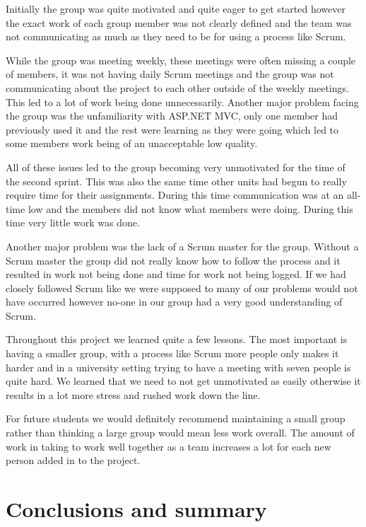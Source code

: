 \documentclass[a4paper,titlepage,12pt]{article}
\let\stdsection\section
\renewcommand\section{\newpage\stdsection}
\begin{document}
Initially the group was quite motivated and quite eager to get started however
the exact work of each group member was not clearly defined and the team was
not communicating as much as they need to be for using a process like Scrum.

While the group was meeting weekly, these meetings were often missing a couple
of members, it was not having daily Scrum meetings and the group was not
communicating about the project to each other outside of the weekly meetings.
This led to a lot of work being done unnecessarily. Another major problem
facing the group was the unfamiliarity with ASP.NET MVC, only one member had
previously used it and the rest were learning as they were going which led to
some members work being of an unacceptable low quality.

All of these issues led to the group becoming very unmotivated for the time of
the second sprint. This was also the same time other units had begun to really
require time for their assignments. During this time communication was at an
all-time low and the members did not know what members were doing. During this
time very little work was done.

Another major problem was the lack of a Scrum master for the group. Without a
Scrum master the group did not really know how to follow the process and it
resulted in work not being done and time for work not being logged. If we had
closely followed Scrum like we were supposed to many of our problems would not
have occurred however no-one in our group had a very good understanding of
Scrum.

Throughout this project we learned quite a few lessons. The most important is
having a smaller group, with a process like Scrum more people only makes it
harder and in a university setting trying to have a meeting with seven people
is quite hard. We learned that we need to not get unmotivated as easily
otherwise it results in a lot more stress and rushed work down the line.

For future students we would definitely recommend maintaining a small group
rather than thinking a large group would mean less work overall. The amount of
work in taking to work well together as a team increases a lot for each new
person added in to the project.

\section{Conclusions and summary}
\end{document}
